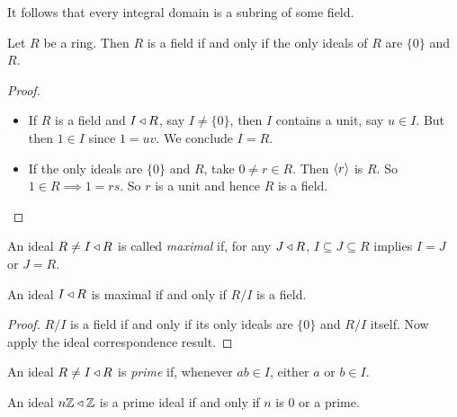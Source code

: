 \documentclass{../../template/note}
\begin{document}
    
    \begin{remark*}
        It follows that every integral domain is a subring of some field.
    \end{remark*}


    \begin{proposition}
        Let $R$ be a ring. Then $R$ is a field if and only if the only ideals of $R$ are $\{0\}$ and $R$.
    \end{proposition}
    
    \begin{proof}\
        \begin{itemize}
            \item[$\implies$] If $R$ is a field and $I \triangleleft R$, say $I \neq \{0\}$, then $I$ contains a unit, say $u \in I$. But then $1 \in I$ since $1 = uv$. We conclude $I = R$.
            \item[$\impliedby$] If the only ideals are $\{0\}$ and $R$, take $0 \neq r \in R$. Then $\left \langle r \right \rangle$ is $R$. So $1 \in R \implies 1 = rs$. So $r$ is a unit and hence $R$ is a field. 
        \end{itemize}
    \end{proof}
    
    \begin{definition}
        An ideal $R \neq I \triangleleft R$ is called \emph{maximal} if, for any $J \triangleleft R$, $I \subseteq J \subseteq R$ implies $I = J$ or $J = R$.
    \end{definition}
    
    \begin{proposition}
        \label{maximal-field}
        An ideal $I \triangleleft R$ is maximal if and only if $R/I$ is a field.
    \end{proposition}
    
    \begin{proof}
        $R/I$ is a field if and only if its only ideals are $\{0\}$ and $R/I$ itself. Now apply the ideal correspondence result.
    \end{proof}
    
    \begin{definition}
        An ideal $R \neq I \triangleleft R$ is \emph{prime} if, whenever $ab \in I$, either $a$ or $b \in I$.
    \end{definition}
    
    \begin{example}
        An ideal $n\mathbb Z \triangleleft \mathbb Z$ is a prime ideal if and only if $n$ is 0 or a prime.
    \end{example}
    
\end{document}
